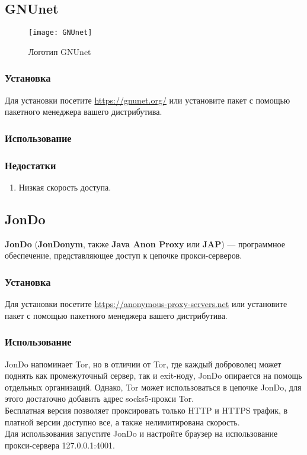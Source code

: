 \subsection{GNUnet}
\begin{wrapfigure}[9]{r}{0.25\linewidth}
\texttt{[image: GNUnet]}
\caption{Логотип GNUnet}
\end{wrapfigure}
\subsubsection{Установка}
Для установки посетите \url{https://gnunet.org/} или установите пакет с помощью пакетного менеджера вашего дистрибутива.
\subsubsection{Использование}
\subsubsection{Недостатки}
\begin{enumerate}
\item Низкая скорость доступа.
\end{enumerate}
\subsection{JonDo}
\textbf{JonDo} (\textbf{JonDonym}, также \textbf{Java Anon Proxy} или \textbf{JAP}) --- программное обеспечение, представляющее доступ к цепочке прокси-серверов.
\subsubsection{Установка}
Для установки посетите \url{https://anonymous-proxy-servers.net} или установите пакет с помощью пакетного менеджера вашего дистрибутива.
\subsubsection{Использование}
JonDo напоминает Tor, но в отличии от Tor, где каждый доброволец может поднять как промежуточный сервер, так и exit-ноду, JonDo опирается на помощь отдельных организаций. Однако, Tor может использоваться в цепочке JonDo, для этого достаточно добавить адрес socks5-прокси Tor.\\
Бесплатная версия позволяет проксировать только HTTP и HTTPS трафик, в платной версии доступно все, а также нелимитирована скорость.\\
Для использования запустите JonDo и настройте браузер на использование прокси-сервера 127.0.0.1:4001.
